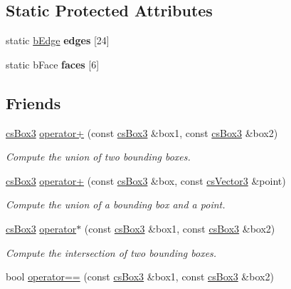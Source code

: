 \subsection*{Static Protected Attributes}
\begin{DoxyCompactItemize}
\item 
static \hyperlink{structcsBox3_1_1bEdge}{b\+Edge} {\bfseries edges} \mbox{[}24\mbox{]}
\item 
static b\+Face {\bfseries faces} \mbox{[}6\mbox{]}
\end{DoxyCompactItemize}
\subsection*{Friends}
\begin{DoxyCompactItemize}
\item 
\hyperlink{classcsBox3}{cs\+Box3} \hyperlink{classcsBox3_ad98ee83b7eb1d53cc48697562e274103}{operator+} (const \hyperlink{classcsBox3}{cs\+Box3} \&box1, const \hyperlink{classcsBox3}{cs\+Box3} \&box2)\hypertarget{classcsBox3_ad98ee83b7eb1d53cc48697562e274103}{}\label{classcsBox3_ad98ee83b7eb1d53cc48697562e274103}

\begin{DoxyCompactList}\small\item\em Compute the union of two bounding boxes. \end{DoxyCompactList}\item 
\hyperlink{classcsBox3}{cs\+Box3} \hyperlink{classcsBox3_a07e11249f0a94add75fc8bc865070ce9}{operator+} (const \hyperlink{classcsBox3}{cs\+Box3} \&box, const \hyperlink{classcsVector3}{cs\+Vector3} \&point)\hypertarget{classcsBox3_a07e11249f0a94add75fc8bc865070ce9}{}\label{classcsBox3_a07e11249f0a94add75fc8bc865070ce9}

\begin{DoxyCompactList}\small\item\em Compute the union of a bounding box and a point. \end{DoxyCompactList}\item 
\hyperlink{classcsBox3}{cs\+Box3} \hyperlink{classcsBox3_ade58ae162d62682f1f66a8e9cbddfd47}{operator$\ast$} (const \hyperlink{classcsBox3}{cs\+Box3} \&box1, const \hyperlink{classcsBox3}{cs\+Box3} \&box2)\hypertarget{classcsBox3_ade58ae162d62682f1f66a8e9cbddfd47}{}\label{classcsBox3_ade58ae162d62682f1f66a8e9cbddfd47}

\begin{DoxyCompactList}\small\item\em Compute the intersection of two bounding boxes. \end{DoxyCompactList}\item 
bool \hyperlink{classcsBox3_a31e84ae705a79224f140d629f68a612b}{operator==} (const \hyperlink{classcsBox3}{cs\+Box3} \&box1, const \hyperlink{classcsBox3}{cs\+Box3} \&box2)\hypertarget{classcsBox3_a31e84ae705a79224f140d629f68a612b}{}\label{classcsBox3_a31e84ae705a79224f140d629f68a612b}


\end{DoxyCompactItemize}
